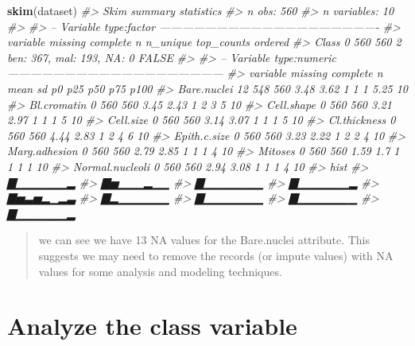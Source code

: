 \documentclass[]{book}
\newenvironment{Shaded}{\begin{snugshade}}{\end{snugshade}}
\newcommand{\CommentTok}[1]{\textcolor[rgb]{0.56,0.35,0.01}{\textit{#1}}}
\newcommand{\DataTypeTok}[1]{\textcolor[rgb]{0.13,0.29,0.53}{#1}}
\newcommand{\DecValTok}[1]{\textcolor[rgb]{0.00,0.00,0.81}{#1}}
\newcommand{\KeywordTok}[1]{\textcolor[rgb]{0.13,0.29,0.53}{\textbf{#1}}}
\newcommand{\NormalTok}[1]{#1}
\newcommand{\OperatorTok}[1]{\textcolor[rgb]{0.81,0.36,0.00}{\textbf{#1}}}
\begin{document}
\begin{Shaded}
\begin{Highlighting}[]
\KeywordTok{skim}\NormalTok{(dataset)}
\CommentTok{#> Skim summary statistics}
\CommentTok{#>  n obs: 560 }
\CommentTok{#>  n variables: 10 }
\CommentTok{#> }
\CommentTok{#> -- Variable type:factor ----------------------------------------------------------}
\CommentTok{#>  variable missing complete   n n_unique                top_counts ordered}
\CommentTok{#>     Class       0      560 560        2 ben: 367, mal: 193, NA: 0   FALSE}
\CommentTok{#> }
\CommentTok{#> -- Variable type:numeric ---------------------------------------------------------}
\CommentTok{#>         variable missing complete   n mean   sd p0 p25 p50  p75 p100}
\CommentTok{#>      Bare.nuclei      12      548 560 3.48 3.62  1   1   1 5.25   10}
\CommentTok{#>      Bl.cromatin       0      560 560 3.45 2.43  1   2   3 5      10}
\CommentTok{#>       Cell.shape       0      560 560 3.21 2.97  1   1   1 5      10}
\CommentTok{#>        Cell.size       0      560 560 3.14 3.07  1   1   1 5      10}
\CommentTok{#>     Cl.thickness       0      560 560 4.44 2.83  1   2   4 6      10}
\CommentTok{#>     Epith.c.size       0      560 560 3.23 2.22  1   2   2 4      10}
\CommentTok{#>    Marg.adhesion       0      560 560 2.79 2.85  1   1   1 4      10}
\CommentTok{#>          Mitoses       0      560 560 1.59 1.7   1   1   1 1      10}
\CommentTok{#>  Normal.nucleoli       0      560 560 2.94 3.08  1   1   1 4      10}
\CommentTok{#>      hist}
\CommentTok{#>  ▇▁▁▁▁▁▁▂}
\CommentTok{#>  ▇▅▁▁▁▂▁▁}
\CommentTok{#>  ▇▁▁▁▁▁▁▁}
\CommentTok{#>  ▇▁▁▁▁▁▁▂}
\CommentTok{#>  ▇▅▃▅▂▁▂▃}
\CommentTok{#>  ▇▂▁▁▁▁▁▁}
\CommentTok{#>  ▇▁▁▁▁▁▁▁}
\CommentTok{#>  ▇▁▁▁▁▁▁▁}
\CommentTok{#>  ▇▁▁▁▁▁▁▂}
\end{Highlighting}
\end{Shaded}

\begin{quote}
we can see we have 13 NA values for the Bare.nuclei attribute. This suggests
we may need to remove the records (or impute values) with NA values for some analysis and modeling techniques.
\end{quote}

\hypertarget{analyze-the-class-variable}{%
\section{Analyze the class variable}\label{analyze-the-class-variable}}

\begin{Shaded}
\end{Shaded}
\end{document}
